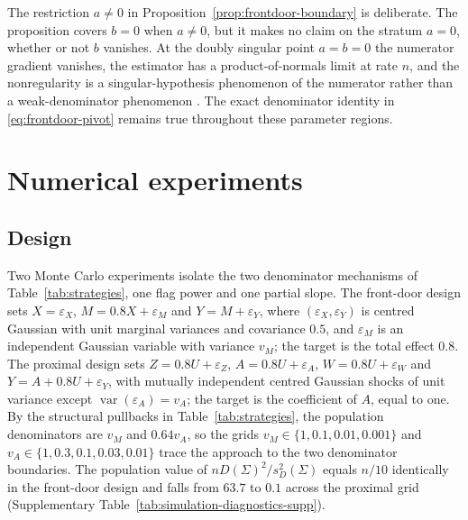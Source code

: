 \documentclass[12pt,a4paper]{article}
\theoremstyle{plain}
\theoremstyle{definition}
\newcommand{\var}{\operatorname{var}}
\newcommand{\eps}{\varepsilon}
\begin{document}
The restriction $a\ne0$ in Proposition~\ref{prop:frontdoor-boundary} is deliberate.
The proposition covers $b=0$ when $a\ne0$, but it makes no claim on the stratum $a=0$, whether or not $b$ vanishes.
At the doubly singular point $a=b=0$ the numerator gradient vanishes, the estimator has a product-of-normals limit at rate $n$, and the nonregularity is a singular-hypothesis phenomenon of the numerator rather than a weak-denominator phenomenon \citep{drtonxiao2016}.
The exact denominator identity in \eqref{eq:frontdoor-pivot} remains true throughout these parameter regions.

\section{Numerical experiments}
\label{sec:numerics}

\subsection{Design}

Two Monte Carlo experiments isolate the two denominator mechanisms of Table~\ref{tab:strategies}, one flag power and one partial slope.
The front-door design sets $X=\eps_X$, $M=0.8X+\eps_M$ and $Y=M+\eps_Y$, where $(\eps_X,\eps_Y)$ is centred Gaussian with unit marginal variances and covariance $0.5$, and $\eps_M$ is an independent Gaussian variable with variance $v_M$;
the target is the total effect $0.8$.
The proximal design sets $Z=0.8U+\eps_Z$, $A=0.8U+\eps_A$, $W=0.8U+\eps_W$ and $Y=A+0.8U+\eps_Y$, with mutually independent centred Gaussian shocks of unit variance except $\var(\eps_A)=v_A$;
the target is the coefficient of $A$, equal to one.
By the structural pullbacks in Table~\ref{tab:strategies}, the population denominators are $v_M$ and $0.64v_A$, so the grids $v_M\in\{1,0.1,0.01,0.001\}$ and $v_A\in\{1,0.3,0.1,0.03,0.01\}$ trace the approach to the two denominator boundaries.
The population value of $nD(\Sigma)^2/s_D^2(\Sigma)$ equals $n/10$ identically in the front-door design and falls from $63.7$ to $0.1$ across the proximal grid (Supplementary Table~\ref{tab:simulation-diagnostics-supp}).
\end{document}
